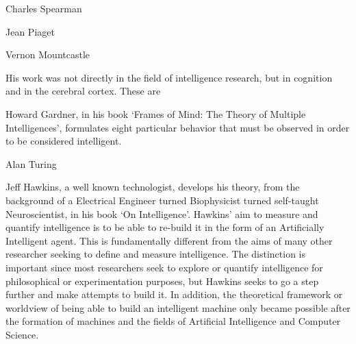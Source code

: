\documentclass[11pt, oneside]{article}
\begin{document}
\par Charles Spearman


\par Jean Piaget


\par Vernon Mountcastle 
\par His work was not directly in the field of intelligence research, but in cognition and in the cerebral cortex. These are 


\par Howard Gardner, in his book `Frames of Mind: The Theory of Multiple Intelligences', formulates eight particular behavior that must be observed in order to be considered intelligent. 


\par Alan Turing


\par Jeff Hawkins, a well known technologist, develops his theory, from the background of a Electrical Engineer turned Biophysicist turned self-taught Neuroscientist, in his book `On Intelligence'. Hawkins' aim to measure and quantify intelligence is to be able to re-build it in the form of an Artificially Intelligent agent. This is fundamentally different from the aims of many other researcher seeking to define and measure intelligence. The distinction is important since most researchers seek to explore or quantify intelligence for philosophical or experimentation purposes, but Hawkins seeks to go a step further and make attempts to build it. In addition, the theoretical framework or worldview of being able to build an intelligent machine only became possible after the formation of machines and the fields of Artificial Intelligence and Computer Science.
\end{document}
